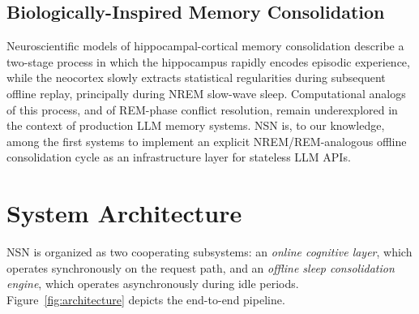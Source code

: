 \documentclass[conference]{IEEEtran}
\begin{document}
\subsection{Biologically-Inspired Memory Consolidation}
Neuroscientific models of hippocampal-cortical memory consolidation describe a two-stage process in which the hippocampus rapidly encodes episodic experience, while the neocortex slowly extracts statistical regularities during subsequent offline replay, principally during NREM slow-wave sleep. Computational analogs of this process, and of REM-phase conflict resolution, remain underexplored in the context of production LLM memory systems. NSN is, to our knowledge, among the first systems to implement an explicit NREM/REM-analogous offline consolidation cycle as an infrastructure layer for stateless LLM APIs.

\section{System Architecture}

NSN is organized as two cooperating subsystems: an \emph{online cognitive layer}, which operates synchronously on the request path, and an \emph{offline sleep consolidation engine}, which operates asynchronously during idle periods. Figure~\ref{fig:architecture} depicts the end-to-end pipeline.
\end{document}
